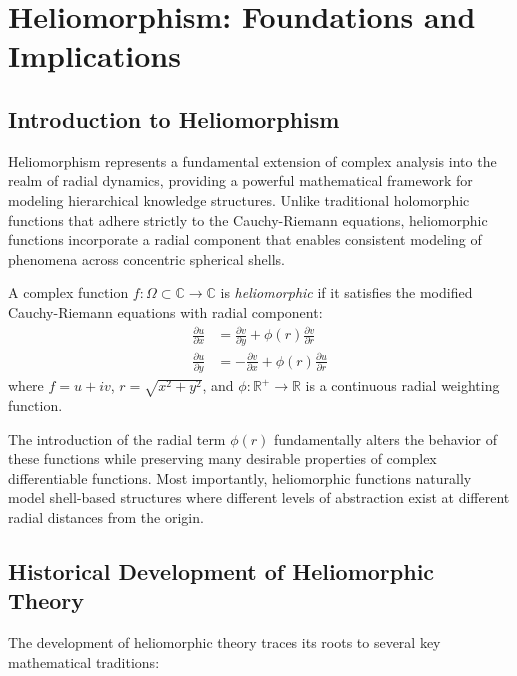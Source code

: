 \chapter{Heliomorphism: Foundations and Implications}

\section{Introduction to Heliomorphism}

Heliomorphism represents a fundamental extension of complex analysis into the realm of radial dynamics, providing a powerful mathematical framework for modeling hierarchical knowledge structures. Unlike traditional holomorphic functions that adhere strictly to the Cauchy-Riemann equations, heliomorphic functions incorporate a radial component that enables consistent modeling of phenomena across concentric spherical shells.

\begin{definition}
A complex function $f: \Omega \subset \mathbb{C} \rightarrow \mathbb{C}$ is \textit{heliomorphic} if it satisfies the modified Cauchy-Riemann equations with radial component:
\begin{align}
\frac{\partial u}{\partial x} &= \frac{\partial v}{\partial y} + \phi(r)\frac{\partial v}{\partial r} \\
\frac{\partial u}{\partial y} &= -\frac{\partial v}{\partial x} + \phi(r)\frac{\partial u}{\partial r}
\end{align}
where $f = u + iv$, $r = \sqrt{x^2 + y^2}$, and $\phi: \mathbb{R}^+ \rightarrow \mathbb{R}$ is a continuous radial weighting function.
\end{definition}

The introduction of the radial term $\phi(r)$ fundamentally alters the behavior of these functions while preserving many desirable properties of complex differentiable functions. Most importantly, heliomorphic functions naturally model shell-based structures where different levels of abstraction exist at different radial distances from the origin.

\section{Historical Development of Heliomorphic Theory}

The development of heliomorphic theory traces its roots to several key mathematical traditions:

